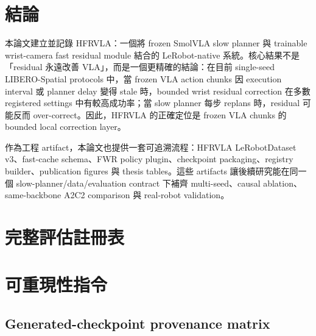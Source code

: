 \documentclass[12pt,a4paper,oneside]{report}
\newcommand{\method}{HFRVLA}
\newcommand{\smolvla}{SmolVLA}
\begin{document}
\chapter{結論}

本論文建立並記錄 \method{}：一個將 frozen \smolvla{} slow planner 與 trainable wrist-camera fast residual module 結合的 LeRobot-native 系統。核心結果不是「residual 永遠改善 VLA」，而是一個更精確的結論：在目前 single-seed LIBERO-Spatial protocols 中，當 frozen VLA action chunks 因 execution interval 或 planner delay 變得 stale 時，bounded wrist residual correction 在多數 registered settings 中有較高成功率；當 slow planner 每步 replans 時，residual 可能反而 over-correct。因此，\method{} 的正確定位是 frozen VLA chunks 的 bounded local correction layer。

作為工程 artifact，本論文也提供一套可追溯流程：HFRVLA LeRobotDataset v3、fast-cache schema、FWR policy plugin、checkpoint packaging、registry builder、publication figures 與 thesis tables。這些 artifacts 讓後續研究能在同一個 slow-planner/data/evaluation contract 下補齊 multi-seed、causal ablation、same-backbone A2C2 comparison 與 real-robot validation。

\appendix

\chapter{完整評估註冊表}
\label{app:registry}



\chapter{可重現性指令}

\section{Generated-checkpoint provenance matrix}
\end{document}

